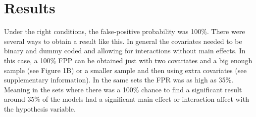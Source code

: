 \section{Results} 
Under the right conditions, the false-positive probability was 100\%. There were several ways to obtain a result like this. In general the covariates needed to be binary and dummy coded and allowing for interactions without main effects. In this case, a 100\% FPP can be obtained just with two covariates and a big enough sample (see Figure 1B) or a smaller sample and then using extra covariates (see supplementary information). In the same sets the FPR was as high as 35\%. Meaning in the sets where there was a 100\% chance to find a significant result around 35\% of the models had a significant main effect or interaction affect with the hypothesis variable. 

